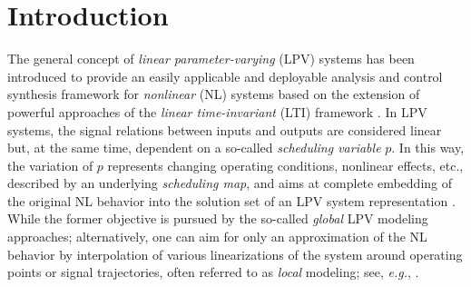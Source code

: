 \section{Introduction\label{sec:intro}}

The general concept of \emph{linear parameter-varying} (LPV) systems has been introduced to provide
an easily applicable and deployable analysis and control synthesis framework for \emph{nonlinear} (NL) systems based on the extension of powerful approaches of the \emph{linear time-invariant} (LTI) framework \citep{mohammadpour2011lpv,Toth2010SpringerBook,APKARIAN19951251}. In LPV systems, the signal relations between inputs and outputs are considered linear but, at the same time, dependent on a so-called \emph{scheduling variable} $p$. %
In this way, the variation of $p$ represents changing operating conditions, nonlinear effects, etc., described by an underlying \emph{scheduling map}, and aims at complete embedding of the original NL behavior into the solution set of an LPV system representation \citep{Toth2010SpringerBook,Rugh00}. While the former objective is pursued by the so-called \emph{global} LPV modeling approaches; alternatively, one can aim for only an approximation of the NL behavior by interpolation of various linearizations of the system around operating points or signal trajectories, often referred to as \emph{local} modeling; see, \emph{e.g.}, \citep{Toth14JPC,Shamma90c}.

